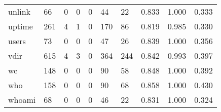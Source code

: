 \begin{longtable}{lp{1.3cm}p{1.3cm}p{1.3cm}p{1.3cm}p{1.3cm}p{1.3cm}p{1.3cm}p{1.3cm}p{1.3cm}}
unlink    &                     66 &                                             0 &                                            0 &                                           0 &                                           44 &                                         22 &                                0.833 &                                  1.000 &                                0.333 \\
uptime    &                    261 &                                             4 &                                            1 &                                           0 &                                          170 &                                         86 &                                0.819 &                                  0.985 &                                0.330 \\
users     &                     73 &                                             0 &                                            0 &                                           0 &                                           47 &                                         26 &                                0.839 &                                  1.000 &                                0.356 \\
vdir      &                    615 &                                             4 &                                            3 &                                           0 &                                          364 &                                        244 &                                0.842 &                                  0.993 &                                0.397 \\
wc        &                    148 &                                             0 &                                            0 &                                           0 &                                           90 &                                         58 &                                0.848 &                                  1.000 &                                0.392 \\
who       &                    158 &                                             0 &                                            0 &                                           0 &                                           90 &                                         68 &                                0.858 &                                  1.000 &                                0.430 \\
whoami    &                     68 &                                             0 &                                            0 &                                           0 &                                           46 &                                         22 &                                0.831 &                                  1.000 &                                0.324 \\

\end{longtable}
